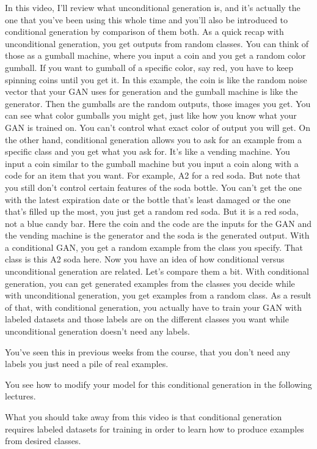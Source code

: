 \documentclass[11pt, onecolumn]{article}
\begin{document}
In this video, I'll review what unconditional generation is, and it's actually the one that you've been
using this whole time and you'll also be introduced to conditional generation by comparison of them both.
As a quick recap with unconditional generation, you get outputs from random classes.
You can think of those as a gumball machine,
where you input a coin
and you get a random color gumball.
If you want to gumball of a specific color,
say red, you have to keep spinning
coins until you get it.
In this example, the coin is
like the random noise vector that
your GAN uses for generation
and the gumball machine is like the generator.
Then the gumballs are the random outputs,
those images you get.
You can see what color gumballs you might get,
just like how you know what your GAN is trained on.
You can't control what
exact color of output you will get.
On the other hand, conditional generation
allows you to ask for
an example from a specific class
and you get what you ask for.
It's like a vending machine.
You input a coin similar to the gumball machine but
you input a coin along with
a code for an item that you want.
For example, A2 for a red soda.
But note that you still don't
control certain features of the soda bottle.
You can't get the one with the latest
expiration date or the bottle
that's least damaged or
the one that's filled up the most,
you just get a random red soda.
But it is a red soda,
not a blue candy bar.
Here the coin and the code are the inputs for the GAN and
the vending machine is the generator
and the soda is the generated output.
With a conditional GAN, you get
a random example from the class you specify.
That class is this A2 soda here.
Now you have an idea of how conditional versus
unconditional generation are related.
Let's compare them a bit.
With conditional generation, you can
get generated examples from
the classes you decide
while with unconditional generation,
you get examples from a random class.
As a result of that, with conditional generation,
you actually have to train your GAN with
labeled datasets and those labels are
on the different classes you want while
unconditional generation doesn't need any labels.

You've seen this in previous weeks from the course, that you don't need any labels you just need a pile of real examples.

You see how to modify your model for this conditional generation in the following lectures.

What you should take away from this video is that conditional generation requires labeled datasets for training in order to learn how to produce examples from desired classes.
\end{document}
